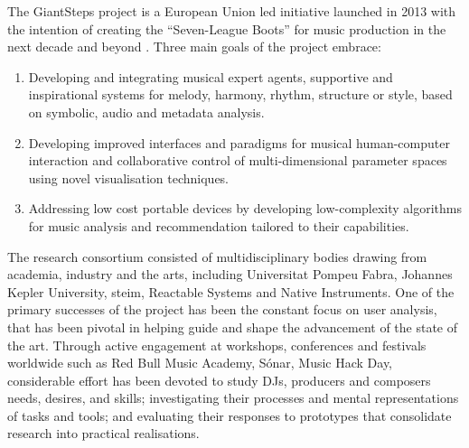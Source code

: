 %

The GiantSteps project is a European Union led initiative launched in 2013 with the intention of creating the ``Seven-League Boots'' for music production in the next decade and beyond \citep{Knees2016a}. Three main goals of the project embrace:

\begin{enumerate}
  \item Developing and integrating musical expert agents, supportive and inspirational systems for melody, harmony, rhythm, structure or style, based on symbolic, audio and metadata analysis.
  \item Developing improved interfaces and paradigms for musical human-computer interaction and collaborative control of multi-dimensional parameter spaces using novel visualisation techniques.
  \item Addressing low cost portable devices by developing low-complexity algorithms for music analysis and recommendation tailored to their capabilities.
\end{enumerate}

The research consortium consisted of multidisciplinary bodies drawing from academia, industry and the arts, including Universitat Pompeu Fabra, Johannes Kepler University, \acrshort{steim}, Reactable Systems and Native Instruments. One of the primary successes of the project has been the constant focus on user analysis, that has been pivotal in helping guide and shape the advancement of the state of the art. Through active engagement at workshops, conferences and festivals worldwide such as Red Bull Music Academy, Sónar, Music Hack Day, considerable effort has been devoted to study DJs, producers and composers needs, desires, and skills; investigating their processes and mental representations of tasks and tools; and evaluating their responses to prototypes that consolidate research into practical realisations. 

